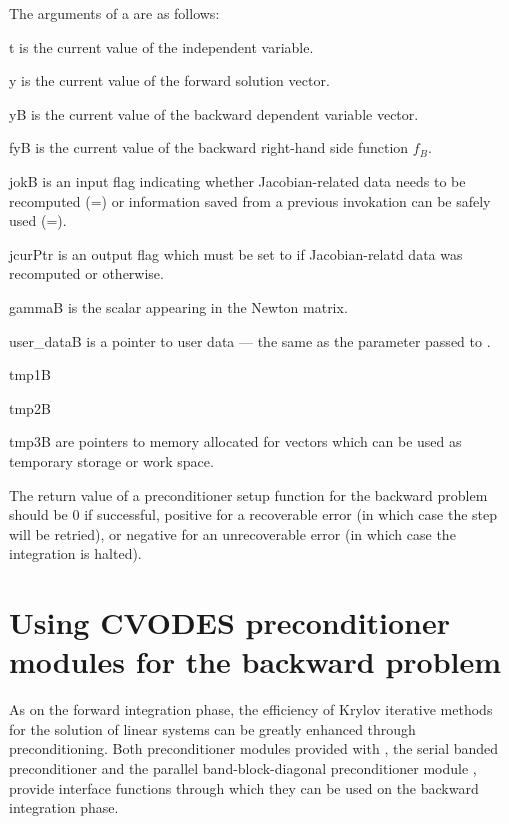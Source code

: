 {
  The arguments of a  are as follows:
  \begin{args}
  \item[t]
    is the current value of the independent variable.
  \item[y]
    is the current value of the forward solution vector.
  \item[yB]
    is the current value of the backward dependent variable vector.
  \item[fyB]
    is the current value of the backward right-hand side function $f_B$.
  \item[jokB]
    is an input flag indicating whether Jacobian-related
    data needs to be recomputed (=) or information saved 
    from a previous invokation can be safely used (=).
  \item[jcurPtr]
    is an output flag which must be set to  if Jacobian-relatd data 
    was recomputed or  otherwise.
  \item[gammaB]
    is the scalar appearing in the Newton matrix.
  \item[user\_dataB]
    is a pointer to user data --- the same as the 
    parameter passed to .
  \item[tmp1B]
  \item[tmp2B]
  \item[tmp3B]
    are pointers to memory allocated for vectors which can be used           
    as temporary storage or work space.    
  \end{args}
}
{
  The return value of a preconditioner setup function for the backward
  problem should be $0$ if successful, 
  positive for a recoverable error (in which case the step will be retried),     
  or negative for an unrecoverable error (in which case the integration is halted).
}
{}


\section{Using CVODES preconditioner modules for the backward problem}

As on the forward integration phase, the efficiency of Krylov iterative methods 
for the solution of linear systems can be greatly enhanced through preconditioning.
Both preconditioner modules provided with {\sundials}, the serial banded
preconditioner {\cvbandpre} and the parallel band-block-diagonal preconditioner
module {\cvbbdpre}, provide interface functions through which they can be used 
on the backward integration phase.


